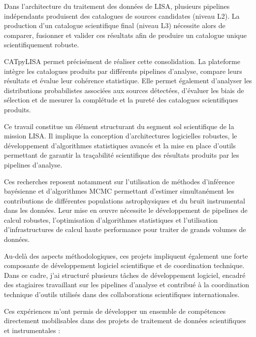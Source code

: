 \documentclass[11pt,a4paper]{altacv}
\begin{document}
{Dans l'architecture du traitement des données de LISA, plusieurs pipelines indépendants produisent des catalogues de sources candidates (niveau L2). La production d'un catalogue scientifique final (niveau L3) nécessite alors de comparer, fusionner et valider ces résultats afin de produire un catalogue unique scientifiquement robuste.

CATpyLISA permet précisément de réaliser cette consolidation. La plateforme intègre les catalogues produits par différents pipelines d'analyse, compare leurs résultats et évalue leur cohérence statistique. Elle permet également d'analyser les distributions probabilistes associées aux sources détectées, d'évaluer les biais de sélection et de mesurer la complétude et la pureté des catalogues scientifiques produits.

Ce travail constitue un élément structurant du segment sol scientifique de la mission LISA. Il implique la conception d'architectures logicielles robustes, le développement d'algorithmes statistiques avancés et la mise en place d'outils permettant de garantir la traçabilité scientifique des résultats produits par les pipelines d'analyse.

Ces recherches reposent notamment sur l'utilisation de méthodes d'inférence bayésienne et d'algorithmes MCMC permettant d'estimer simultanément les contributions de différentes populations astrophysiques et du bruit instrumental dans les données. Leur mise en œuvre nécessite le développement de pipelines de calcul robustes, l'optimisation d'algorithmes statistiques et l'utilisation d'infrastructures de calcul haute performance pour traiter de grands volumes de données.

Au-delà des aspects méthodologiques, ces projets impliquent également une forte composante de développement logiciel scientifique et de coordination technique. Dans ce cadre, j'ai structuré plusieurs tâches de développement logiciel, encadré des stagiaires travaillant sur les pipelines d'analyse et contribué à la coordination technique d'outils utilisés dans des collaborations scientifiques internationales.

Ces expériences m'ont permis de développer un ensemble de compétences directement mobilisables dans des projets de traitement de données scientifiques et instrumentales :

}
\end{document}
